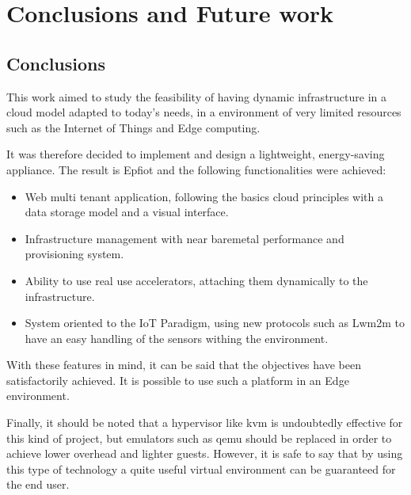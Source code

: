 
\cleardoublepage


\chapter{Conclusions and Future work}
\label{makereference7}
\section{Conclusions}
\label{makereference7.1}

This work aimed to study the feasibility of having dynamic infrastructure in a cloud model adapted to today's needs, in a environment of very limited resources such as the Internet of Things and Edge computing.

It was therefore decided to implement and design a lightweight, energy-saving appliance. The result is Epfiot and the following functionalities were achieved:
\begin{itemize}
    \item Web multi tenant application, following the basics cloud principles with a data storage model and a visual interface.
    \item Infrastructure management with near baremetal performance and provisioning system.
    \item Ability to use real use accelerators, attaching them dynamically to the infrastructure.
    \item System oriented to the IoT Paradigm, using new protocols such as Lwm2m to have an easy handling of the sensors withing the environment.
\end{itemize}

With these features in mind, it can be said that the objectives have been satisfactorily achieved. It is possible to use such a platform in an Edge environment.

Finally, it should be noted that a hypervisor like kvm is undoubtedly effective for this kind of project, but emulators such as qemu should be replaced in order to achieve lower overhead and lighter guests. However, it is safe to say that by using this type of technology a quite useful virtual environment can be guaranteed for the end user.

